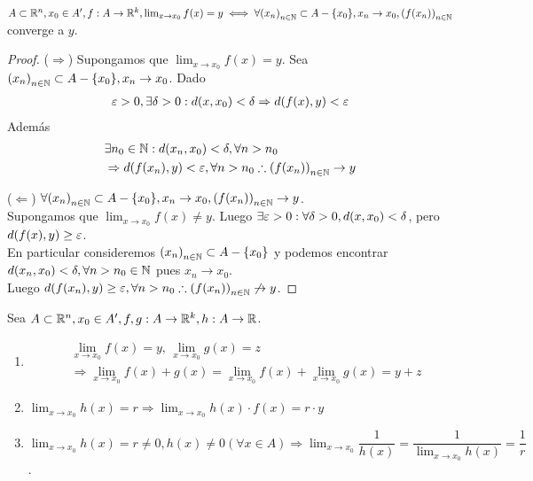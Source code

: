 \begin{prop}
  \(A \subset \mathbb{R}^n, x_0 \in A^{\prime}, f: A \to \mathbb{R}^k, \lim_{x \to x_0} f(x) = y \iff \forall {(x_n)}_{n \in \mathbb{N}} \subset A - \{x_0\}, x_n \to x_0, {(f(x_n))}_{n \in \mathbb{N}} \) converge a \(y\).
  \begin{proof}
    (\(\Rightarrow \)) Supongamos que \(\lim_{x \to x_0} f(x) = y\). Sea \({(x_n)}_{n \in \mathbb{N}} \subset A - \{x_0\}, x_n \to x_0\). Dado \begin{align*}
      \varepsilon > 0, \exists \delta > 0 : d(x, x_0) < \delta \Rightarrow d(f(x), y) < \varepsilon
    \end{align*} Además \begin{align*}
       & \exists n_0 \in \mathbb{N} : d(x_n, x_0) < \delta, \forall n > n_0                          \\
       & \Rightarrow d(f(x_n), y) < \varepsilon, \forall n > n_0 \therefore {(f(x_n))}_{n \in \mathbb{N}} \to y
    \end{align*}

    (\(\Leftarrow\)) \(\forall {(x_n)}_{n \in \mathbb{N}} \subset A - \{x_0\}, x_n \to x_0, {(f(x_n))}_{n \in \mathbb{N}} \to y\). \\
    Supongamos que \(\lim_{x \to x_0} f(x) \neq y\). Luego \(\exists \varepsilon > 0 : \forall \delta > 0, d(x, x_0) < \delta \), pero \(d(f(x), y) \geq \varepsilon \). \\
    En particular consideremos \({(x_n)}_{n \in \mathbb{N}} \subset A - \{x_0\} \) y podemos encontrar \(d(x_n, x_0) < \delta, \forall n > n_0 \in \mathbb{N} \) pues \(x_n \to x_0\). \\
    Luego \(d(f(x_n), y) \geq \varepsilon, \forall n > n_0 \therefore {(f(x_n))}_{n \in \mathbb{N}} \not \to y\).
  \end{proof}
\end{prop}

\begin{prop}
  Sea \(A \subset \mathbb{R}^n, x_0 \in A^{\prime}, f, g: A \to \mathbb{R}^k, h: A \to \mathbb{R} \).
  \begin{enumerate}
    \item \begin{align*}
             & \lim_{x \to x_0} f(x) = y\text{, } \lim_{x \to x_0} g(x) = z                                   \\
             & \Rightarrow \lim_{x \to x_0} f(x) + g(x) = \lim_{x \to x_0} f(x) + \lim_{x \to x_0} g(x) = y+z
          \end{align*}
    \item \(\lim_{x \to x_0} h(x) = r \Rightarrow \lim_{x \to x_0} h(x) \cdot f(x) = r \cdot y\)
    \item \(\lim_{x \to x_0} h(x) = r \neq 0, h(x) \neq 0 (\forall x \in A) \Rightarrow \lim_{x \to x_0} \dfrac{1}{h(x)} = \dfrac{1}{\lim_{x \to x_0} h(x)} = \dfrac{1}{r} \).
  \end{enumerate}
\end{prop}

